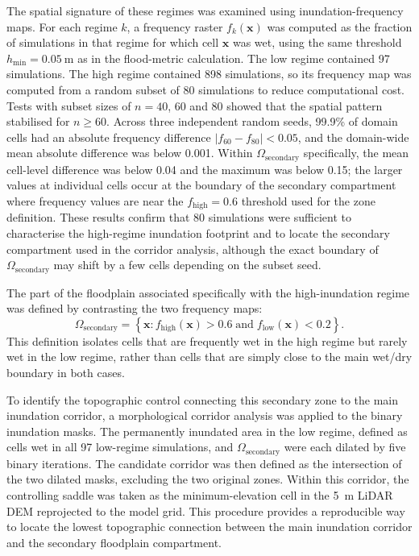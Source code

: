 \documentclass[a4paper,fleqn]{cas-sc}
\begin{document}
The spatial signature of these regimes was examined using inundation-frequency maps. For each regime $k$, a frequency raster $f_k(\mathbf{x})$ was computed as the fraction of simulations in that regime for which cell $\mathbf{x}$ was wet, using the same threshold $h_{\min}=0.05~\mathrm{m}$ as in the flood-metric calculation. The low regime contained 97 simulations. The high regime contained 898 simulations, so its frequency map was computed from a random subset of 80 simulations to reduce computational cost. Tests with subset sizes of $n = 40$, 60 and 80 showed that the spatial pattern stabilised for $n \geq 60$. Across three independent random seeds, 99.9\% of domain cells had an absolute frequency difference $|f_{60} - f_{80}| < 0.05$, and the domain-wide mean absolute difference was below 0.001. Within $\Omega_{\mathrm{secondary}}$ specifically, the mean cell-level difference was below 0.04 and the maximum was below 0.15; the larger values at individual cells occur at the boundary of the secondary compartment where frequency values are near the $f_{\mathrm{high}} = 0.6$ threshold used for the zone definition. These results confirm that 80 simulations were sufficient to characterise the high-regime inundation footprint and to locate the secondary compartment used in the corridor analysis, although the exact boundary of $\Omega_{\mathrm{secondary}}$ may shift by a few cells depending on the subset seed.

The part of the floodplain associated specifically with the high-inundation regime was defined by contrasting the two frequency maps: 
\begin{equation}
\Omega_{\mathrm{secondary}} =
\left\{
\mathbf{x} :
f_{\mathrm{high}}(\mathbf{x}) > 0.6
\;\text{and}\;
f_{\mathrm{low}}(\mathbf{x}) < 0.2
\right\}.
\end{equation}
This definition isolates cells that are frequently wet in the high regime but rarely wet in the low regime, rather than cells that are simply close to the main wet/dry boundary in both cases.

To identify the topographic control connecting this secondary zone to the main inundation corridor, a morphological corridor analysis was applied to the binary inundation masks. The permanently inundated area in the low regime, defined as cells wet in all 97 low-regime simulations, and $\Omega_{\mathrm{secondary}}$ were each dilated by five binary iterations. The candidate corridor was then defined as the intersection of the two dilated masks, excluding the two original zones. Within this corridor, the controlling saddle was taken as the minimum-elevation cell in the 5~m LiDAR DEM reprojected to the model grid. This procedure provides a reproducible way to locate the
lowest topographic connection between the main inundation corridor and the secondary floodplain compartment.
\end{document}
